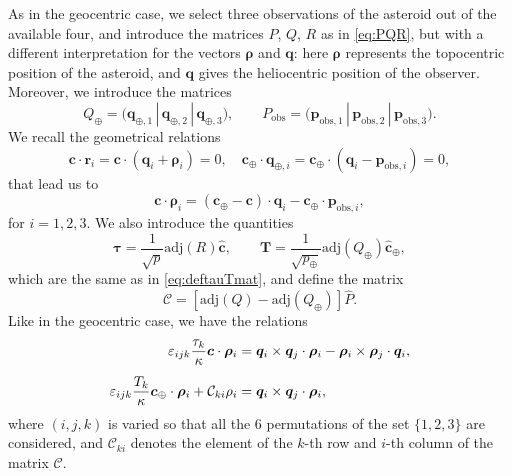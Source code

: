 \documentclass[11pt]{article}
\def\angmom{\bm{c}}
\def\bq{\bm{q}}
\def\br{\bm{r}}
\def\rhovec{{\bm{\rho}}}
\def\angmom{{\bm{c}}}
\def\adj{\text{adj}}
\begin{document}
As in the geocentric case, we select three observations of the asteroid out of the available four, and introduce the matrices $P$, $Q$, $R$ as in \eqref{eq:PQR}, but with a different interpretation for the vectors $\bm{\rho}$ and $\bm{q}$: here $\bm{\rho}$ represents the topocentric position of the asteroid, and $\bm{q}$ gives the heliocentric position of the observer.
Moreover, we introduce the matrices
\begin{equation*}
    Q_\oplus = {\bigl(\bm{q}_{\oplus,1}\, |\,   
                      \bm{q}_{\oplus,2}\, |\, 
                      \bm{q}_{\oplus,3}\bigr)}, \qquad
    P_\text{obs} = {\bigl(\bm{p}_{\text{obs},1}\, |\,   
                          \bm{p}_{\text{obs},2}\, |\, 
                          \bm{p}_{\text{obs},3}\bigr)}.
\end{equation*}
We recall the geometrical relations
\begin{equation*}\label{eq:relClaTop}
    \angmom\cdot\br_i = \angmom\cdot(\bq_i+\rhovec_i)= 0,\quad \angmom_\oplus\cdot\bq_{\oplus,i} =
    \angmom_\oplus\cdot(\bq_i - \bm{p}_{\text{obs},i}) = 0,
\end{equation*}
that lead us to
\begin{equation}\label{eq:relMomAngTop}
    \angmom\cdot\rhovec_i = (\angmom_\oplus-\angmom)\cdot\bq_i - \angmom_\oplus\cdot\bm{p}_{\text{obs},i},
\end{equation}
for $i=1,2,3$.
We also introduce the quantities 
\begin{equation}
    \bm{\tau} = \frac{1}{\sqrt{p}} \adj(R)\hat{\bm{c}},
    \qquad
    \bm{T} = \frac{1}{\sqrt{p_\oplus}} \adj(Q_\oplus)\hat{\bm{c}}_\oplus,
    \label{Ttau_top}
\end{equation}
which are the same as in \eqref{eq:deftauTmat}, and define the matrix
\begin{equation}
    \mathcal{C} = \left[\adj(Q)-\adj(Q_\oplus)\right]\hat{P}.
    \label{eq:matrixC_top}
\end{equation}
%
Like in the geocentric case, we have the relations
\begin{align}
    \varepsilon_{ijk}\frac{\tau_k}{\kappa}\bm{c}\cdot\bm{\rho}_i &= \bm{q}_i\times\bm{q}_j \cdot\bm{\rho}_i -
    \bm{\rho}_i\times\bm{\rho}_j \cdot\bm{q}_i,\label{eq:reltau_top}\\[1ex]
    \varepsilon_{ijk}\frac{T_k}{\kappa}\bm{c}_\oplus\cdot\bm{\rho}_i + {\cal C}_{ki}\rho_i &= \bm{q}_i\times\bm{q}_j \cdot\bm{\rho}_i,
    \label{eq:relbigT_top}
\end{align}
where $(i,j,k)$ is varied  so  that  all  the  6 permutations of the set $\{1,2,3\}$ are considered, and $\mathcal{C}_{ki}$ denotes the element of the $k$-th row and $i$-th column of the matrix $\mathcal{C}$.
\end{document}

